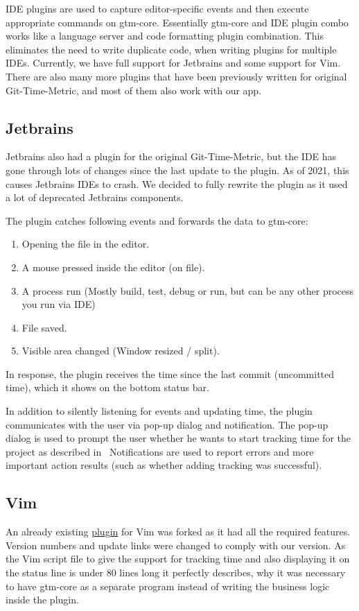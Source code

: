IDE plugins are used to capture editor-specific events and then execute appropriate commands on gtm-core.
Essentially gtm-core and IDE plugin combo works like a language server and code formatting plugin combination.
This eliminates the need to write duplicate code, when writing plugins for multiple IDEs.
Currently, we have full support for Jetbrains and some support for Vim.
There are also many more plugins that have been previously written for original Git-Time-Metric, and most of them also work with our app.

\subsection{Jetbrains}\label{subsec:jetbrains-plugin}
Jetbrains also had a plugin for the original Git-Time-Metric, but the IDE has gone through lots of changes since the last update to the plugin.
As of 2021, this causes Jetbrains IDEs to crash.
We decided to fully rewrite the plugin as it used a lot of deprecated Jetbrains components.

The plugin catches following events and forwards the data to gtm-core:
\begin{enumerate}
    \item Opening the file in the editor.
    \item A mouse pressed inside the editor (on file).
    \item A process run (Mostly build, test, debug or run, but can be any other process you run via IDE)
    \item File saved.
    \item Visible area changed (Window resized / split).
\end{enumerate}

In response, the plugin receives the time since the last commit (uncommitted time), which it shows on the bottom status bar.

In addition to silently listening for events and updating time, the plugin communicates with the user via pop-up dialog and notification.
The pop-up dialog is used to prompt the user whether he wants to start tracking time for the project as described in~
Notifications are used to report errors and more important action results (such as whether adding tracking was successful).

\subsection{Vim}\label{subsec:vim-plugin}
An already existing \href{https://github.com/git-time-metric/gtm-vim-plugin}{plugin} for Vim was forked as it had all the required features.
Version numbers and update links were changed to comply with our version.
As the Vim script file to give the support for tracking time and also displaying it on the status line is under 80 lines long
it perfectly describes, why it was necessary to have gtm-core as a separate program instead of writing the business logic inside the plugin.


